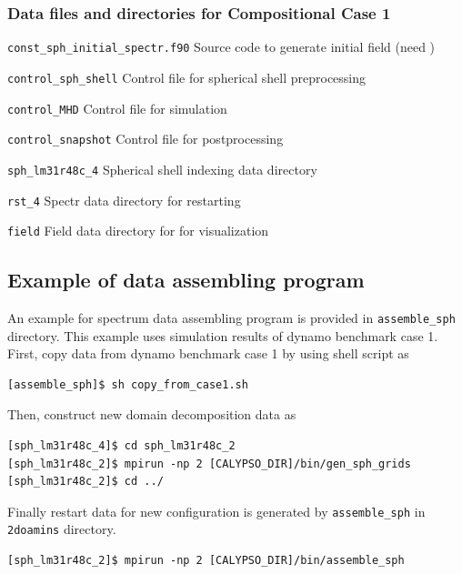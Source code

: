\subsubsection{Data files and directories for Compositional Case 1}
\label{section:bench_case1C}
%
\begin{description}
\item{\tt const\_sph\_initial\_spectr.f90}	Source code to generate initial field (need )
\item{\tt control\_sph\_shell}	Control file for spherical shell preprocessing
\item{\tt control\_MHD}		Control file for simulation
\item{\tt control\_snapshot}	Control file for postprocessing
\item{\tt sph\_lm31r48c\_4} 	Spherical shell indexing data directory
\item{\tt rst\_4}				Spectr data directory for restarting
\item{\tt field}				Field data directory for for visualization
\end{description}
%

\subsection{Example of data assembling program}
An example for spectrum data assembling program is provided in \verb|assemble_sph| directory. This example uses simulation results of dynamo benchmark case 1.
First, copy data from dynamo benchmark case 1 by using shell script as
%
\begin{verbatim}
[assemble_sph]$ sh copy_from_case1.sh
\end{verbatim}

Then, construct new domain decomposition data as 
%
\begin{verbatim}
[sph_lm31r48c_4]$ cd sph_lm31r48c_2
[sph_lm31r48c_2]$ mpirun -np 2 [CALYPSO_DIR]/bin/gen_sph_grids
[sph_lm31r48c_2]$ cd ../
\end{verbatim}

Finally restart data for new configuration is generated by \verb|assemble_sph| in \verb|2doamins| directory.
\begin{verbatim}
[sph_lm31r48c_2]$ mpirun -np 2 [CALYPSO_DIR]/bin/assemble_sph
\end{verbatim}


